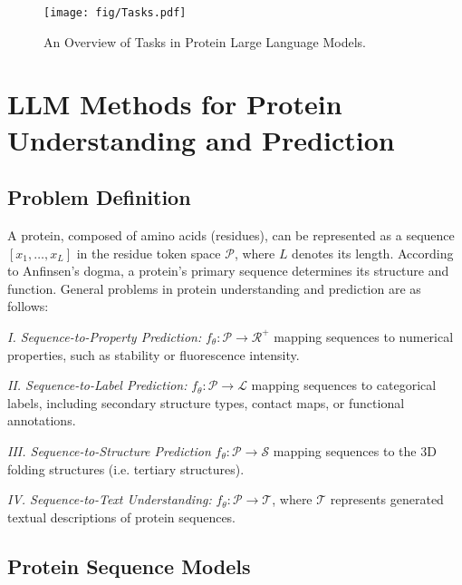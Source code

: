 \begin{figure*}[htbp]
    \centering
    \texttt{[image: fig/Tasks.pdf]}
    \caption{An Overview of Tasks in Protein Large Language Models.}
    \label{fig:methods}
\end{figure*}


\section{LLM Methods for Protein Understanding and Prediction}


\label{sec:llm_understanding}

\subsection{Problem Definition}

A protein, composed of amino acids (residues), can be represented as a sequence \( [x_1, \dots, x_L] \) in the residue token space \( \mathcal{P} \), where \(L\) denotes its length. According to Anfinsen's dogma, a protein’s primary sequence determines its structure and function. General problems in protein understanding and prediction are as follows:


\noindent \textit{I. Sequence-to-Property Prediction:} \( f_\theta: \mathcal{P} \rightarrow \mathcal{R}^+ \) mapping sequences to numerical properties, such as stability or fluorescence intensity.

\noindent \textit{II. Sequence-to-Label Prediction:} \( f_\theta: \mathcal{P} \rightarrow \mathcal{L} \) mapping sequences to categorical labels, including secondary structure types, contact maps, or functional annotations.

\noindent \textit{III. Sequence-to-Structure Prediction} \( f_\theta: \mathcal{P} \rightarrow \mathcal{S} \) mapping sequences to the 3D folding structures (i.e. tertiary structures). 

\noindent \textit{IV. Sequence-to-Text Understanding:} \( f_\theta: \mathcal{P} \rightarrow \mathcal{T} \), where \( \mathcal{T} \) represents generated textual descriptions of protein sequences.


\subsection{Protein Sequence Models}


